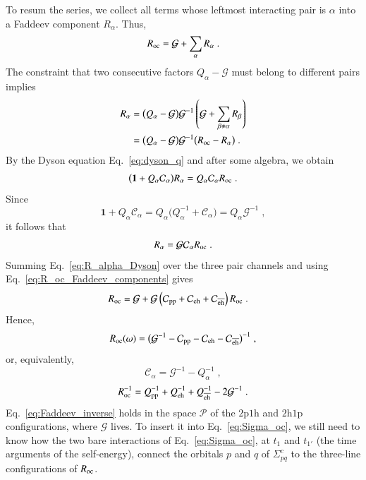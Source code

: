 \documentclass[aip,jcp,reprint,noshowkeys,superscriptaddress]{revtex4-1}
\newcommand{\hhp}{\text{2h1p}}
\newcommand{\pph}{\text{2p1h}}
\newcommand{\eh}{\text{eh}}
\newcommand{\teh}{\overline{\text{eh}}}
\newcommand{\pp}{\text{pp}}
\begin{document}
To resum the series, we collect all terms whose leftmost interacting
pair is $\alpha$ into a Faddeev component $R_\alpha$. Thus,
\begin{equation}
	R_{\rm oc}
	=
	\mathcal G+\sum_\alpha R_\alpha \;.
	\label{eq:R_oc_Faddeev_components}
\end{equation}
The constraint that two consecutive factors $Q_\alpha-\mathcal G$ must belong to
different pairs implies
\begin{equation}
\begin{aligned}
	R_\alpha
	={}&
	\big(Q_\alpha-\mathcal G\big)\mathcal G^{-1}
	\left(
		\mathcal G+\sum_{\beta\neq\alpha}R_\beta
	\right)
	\\
	={}&
	\big(Q_\alpha-\mathcal G\big)\mathcal G^{-1}
	\big(R_{\rm oc}-R_\alpha\big) \;.
	\label{eq:Faddeev_components}
\end{aligned}
\end{equation}
By the Dyson equation Eq.~\eqref{eq:dyson_q}
and after some algebra, we obtain
\begin{equation}
	\big(\mathbf 1+Q_\alpha\mathcal C_\alpha\big)R_\alpha
	=
	Q_\alpha\mathcal C_\alpha R_{\rm oc} \;.
\end{equation}
Since
\begin{equation}
	\mathbf 1+Q_\alpha\mathcal C_\alpha
	=
	Q_\alpha
	\big(Q_\alpha^{-1}+\mathcal C_\alpha\big)
	=
	Q_\alpha\mathcal G^{-1} \;,
\end{equation}
it follows that
\begin{equation}
	R_\alpha
	=
	\mathcal G\mathcal C_\alpha R_{\rm oc} \;.
	\label{eq:R_alpha_Dyson}
\end{equation}
Summing Eq.~\eqref{eq:R_alpha_Dyson} over the three pair channels and
using Eq.~\eqref{eq:R_oc_Faddeev_components} gives
\begin{equation}
\begin{aligned}
	R_{\rm oc}
	={}&
	\mathcal G
	+
	\mathcal G
	\left(
		\mathcal C_{\pp}
		+\mathcal C_{\eh}
		+\mathcal C_{\teh}
	\right)
	R_{\rm oc} \;.
\end{aligned}
\end{equation}
Hence,
\begin{equation}
	R_{\rm oc}(\omega)
	=
	\big(
		\mathcal G^{-1}
		-\mathcal C_{\pp}
		-\mathcal C_{\eh}
		-\mathcal C_{\teh}
	\big)^{-1} \;,
\end{equation}
or, equivalently,
\begin{equation}
	\mathcal C_\alpha
	=
	\mathcal G^{-1}-Q_\alpha^{-1} \;,
\end{equation}
\begin{equation}
\begin{aligned}
	R_{\rm oc}^{-1} =
	Q_{\pp}^{-1}
	+Q_{\eh}^{-1}
	+Q_{\teh}^{-1}
	-2\mathcal G^{-1} \;.
\end{aligned}
\label{eq:Faddeev_inverse}
\end{equation}
Eq.~\eqref{eq:Faddeev_inverse} holds in the
space $\mathcal P$ of the $\pph$ and $\hhp$ configurations, where
$\mathcal G$ lives. To insert it into Eq.~\eqref{eq:Sigma_oc}, we still
need to know how the two bare interactions of Eq.~\eqref{eq:Sigma_oc},
at $t_1$ and $t_{1'}$ (the time arguments of the self-energy),
connect the orbitals $p$ and $q$ of
$\Sigma^c_{pq}$ to the three-line configurations of $R_{\rm oc}$. 
\end{document}
